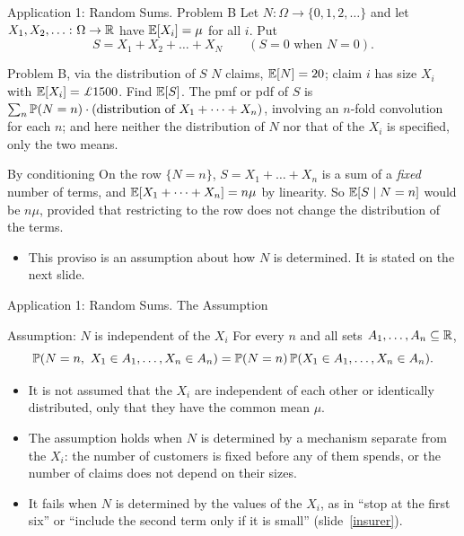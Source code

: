 \begin{frame}{Application 1: Random Sums. Problem B}
  \small
  Let $N\colon\Omega\to\{0,1,2,\dots\}$ and let $X_1,X_2,\dots\colon\Omega\to\mathbb{R}$ have $\mathbb{E}[X_i]=\mu$ for all $i$. Put
  \[
    S=X_1+X_2+\dots+X_N\qquad(S=0\text{ when }N=0).
  \]
  \begin{block}{Problem B, via the distribution of $S$}
    $N$ claims, $\mathbb{E}[N]=20$; claim $i$ has size $X_i$ with $\E[X_i]=\pounds1500$. Find $\mathbb{E}[S]$.
    The pmf or pdf of $S$ is $\sum_n\mathbb{P}(N=n)\cdot(\text{distribution of }X_1+\dots+X_n)$, involving an $n$-fold convolution for each $n$; and here neither the distribution of $N$ nor that of the $X_i$ is specified, only the two means.
  \end{block}
  \begin{block}{By conditioning}
    On the row $\{N=n\}$, $S=X_1+\dots+X_n$ is a sum of a \emph{fixed} number of terms, and $\mathbb{E}[X_1+\dots+X_n]=n\mu$ by linearity. So $\mathbb{E}[S\mid N=n]$ would be $n\mu$, provided that restricting to the row does not change the distribution of the terms.
  \end{block}
  \begin{itemize}
    \item This proviso is an assumption about how $N$ is determined. It is stated on the next slide.
  \end{itemize}
\end{frame}

\begin{frame}{Application 1: Random Sums. The Assumption}
  \small
  \begin{block}{Assumption: $N$ is independent of the $X_i$}
    For every $n$ and all sets $A_1,\dots,A_n\subseteq\mathbb{R}$,
    \[
      \mathbb{P}(N=n,\ X_1\in A_1,\dots,X_n\in A_n)=\mathbb{P}(N=n)\,\mathbb{P}(X_1\in A_1,\dots,X_n\in A_n).
    \]
  \end{block}
  \begin{itemize}
    \item It is not assumed that the $X_i$ are independent of each other or identically distributed, only that they have the common mean $\mu$.
    \item The assumption holds when $N$ is determined by a mechanism separate from the $X_i$: the number of customers is fixed before any of them spends, or the number of claims does not depend on their sizes.
    \item It fails when $N$ is determined by the values of the $X_i$, as in ``stop at the first six'' or ``include the second term only if it is small'' (slide~\ref{insurer}).
  \end{itemize}
\end{frame}

